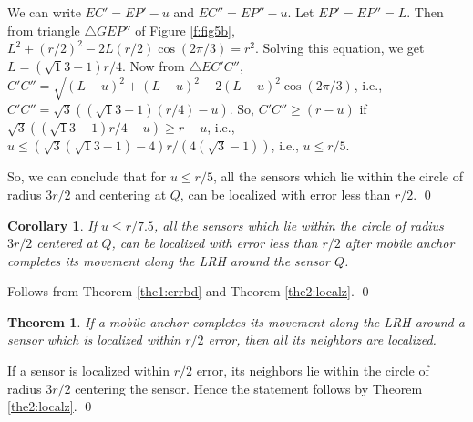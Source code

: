 \documentclass[preprint,11pt]{elsarticle}
\newtheorem{theorem}{Theorem}
\newtheorem{corollary}{Corollary}
\newenvironment{proof}{\noindent{\bf Proof: }}{\qed \smallbreak}
\begin{document}
\begin{proof}
\begin{description}
      We can write $EC'=EP'-u$ and $EC''=EP''-u$. Let $EP'=EP''=L$. Then from triangle $\triangle GEP''$ of Figure \ref{f:fig5b},
      $L^2+(r/2)^2-2L(r/2)\cos (2\pi/3)=r^2$. Solving this equation, we get $L=(\sqrt 13-1)r/4$. Now from  $\triangle EC'C''$,
      $C'C''=\sqrt{(L-u)^2+(L-u)^2-2(L-u)^2\cos (2\pi/3)}$, i.e., $C'C''=\sqrt 3\left((\sqrt 13-1)(r/4)-u\right)$. So, $C'C'' \geq (r-u)$ if $\sqrt 3((\sqrt 13-1)r/4-u)\geq r-u$, i.e., $u\leq (\sqrt 3(\sqrt 13-1)-4)r/(4(\sqrt 3-1))$, i.e., $u\leq r/5$.
\end{description}
So, we can conclude that for $u\leq r/5$, all the sensors which lie within the circle of radius $3r/2$ and centering at $Q$, can be localized with error less than $r/2$.
\end{proof}


\begin{corollary}
\label{cor:cor}
If $u\leq r/7.5$, all the sensors which lie within the circle of radius $3r/2$ centered at $Q$,
can be localized with error less than $r/2$ after mobile anchor completes its movement along the LRH around the sensor $Q$.
\end{corollary}
\begin{proof}
Follows from Theorem \ref{the1:errbd} and Theorem \ref{the2:localz}.
\end{proof}

\begin{theorem}
\label{thm3:nbrslclztn}
If a mobile anchor completes its movement along the LRH around a sensor which is localized within $r/2$ error, then all its neighbors
are localized.
\end{theorem}
\begin{proof}
If  a sensor is localized within $r/2$ error, its neighbors lie within the circle of radius $3r/2$ centering the sensor.
Hence the statement follows by Theorem \ref{the2:localz}.
\end{proof}
\end{document}
